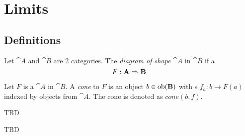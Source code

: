 \chapter{Limits}

\section{Definitions}

\begin{definition}
\label{def:diagram_of_shape}
Let $\cat{A}$ and $\cat{B}$ are 2 categories. The \textit{diagram of
  shape} $\cat{A}$ in $\cat{B}$ if a 
\[
F: \mathbf{A} \Rightarrow \mathbf{B}
\]
\end{definition}

\begin{definition}[Cone]
\label{def:cone}
Let $F$ is a  $\cat{A}$ in $\cat{B}$.
A \textit{cone} to $F$ is an object $b \in \mathrm{ob}(\mathbf{B})$ with
s $f_a: b \to F(a)$ indexed by objects from
$\cat{A}$. The cone is denoted as $cone(b, f)$.
\end{definition}

\begin{definition}[Limit]
\label{def:limit}
TBD
\end{definition}


TBD

